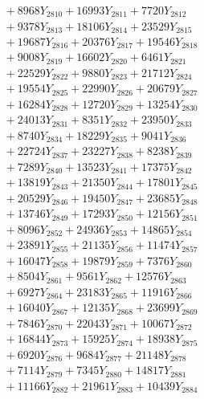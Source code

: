 \documentclass[a4paper,10pt]{article}
\begin{document}
{\begin{align}
&\;  + 8968 Y_{2810} + 16993 Y_{2811} + 7720 Y_{2812} \\[0.3ex]
&\;  + 9378 Y_{2813} + 18106 Y_{2814} + 23529 Y_{2815} \\[0.3ex]
&\;  + 19687 Y_{2816} + 20376 Y_{2817} + 19546 Y_{2818} \\[0.5ex]\allowbreak
&\;  + 9008 Y_{2819} + 16602 Y_{2820} + 6461 Y_{2821} \\[0.3ex]
&\;  + 22529 Y_{2822} + 9880 Y_{2823} + 21712 Y_{2824} \\[0.3ex]
&\;  + 19554 Y_{2825} + 22990 Y_{2826} + 20679 Y_{2827} \\[0.3ex]
&\;  + 16284 Y_{2828} + 12720 Y_{2829} + 13254 Y_{2830} \\[0.3ex]
&\;  + 24013 Y_{2831} + 8351 Y_{2832} + 23950 Y_{2833} \\[0.3ex]
&\;  + 8740 Y_{2834} + 18229 Y_{2835} + 9041 Y_{2836} \\[0.3ex]
&\;  + 22724 Y_{2837} + 23227 Y_{2838} + 8238 Y_{2839} \\[0.3ex]
&\;  + 7289 Y_{2840} + 13523 Y_{2841} + 17375 Y_{2842} \\[0.3ex]
&\;  + 13819 Y_{2843} + 21350 Y_{2844} + 17801 Y_{2845} \\[0.3ex]
&\;  + 20529 Y_{2846} + 19450 Y_{2847} + 23685 Y_{2848} \\[0.5ex]\allowbreak
&\;  + 13746 Y_{2849} + 17293 Y_{2850} + 12156 Y_{2851} \\[0.3ex]
&\;  + 8096 Y_{2852} + 24936 Y_{2853} + 14865 Y_{2854} \\[0.3ex]
&\;  + 23891 Y_{2855} + 21135 Y_{2856} + 11474 Y_{2857} \\[0.3ex]
&\;  + 16047 Y_{2858} + 19879 Y_{2859} + 7376 Y_{2860} \\[0.3ex]
&\;  + 8504 Y_{2861} + 9561 Y_{2862} + 12576 Y_{2863} \\[0.3ex]
&\;  + 6927 Y_{2864} + 23183 Y_{2865} + 11916 Y_{2866} \\[0.3ex]
&\;  + 16040 Y_{2867} + 12135 Y_{2868} + 23699 Y_{2869} \\[0.3ex]
&\;  + 7846 Y_{2870} + 22043 Y_{2871} + 10067 Y_{2872} \\[0.3ex]
&\;  + 16844 Y_{2873} + 15925 Y_{2874} + 18938 Y_{2875} \\[0.3ex]
&\;  + 6920 Y_{2876} + 9684 Y_{2877} + 21148 Y_{2878} \\[0.5ex]\allowbreak
&\;  + 7114 Y_{2879} + 7345 Y_{2880} + 14817 Y_{2881} \\[0.3ex]
&\;  + 11166 Y_{2882} + 21961 Y_{2883} + 10439 Y_{2884} \\[0.3ex]

\end{align}}
\end{document}
